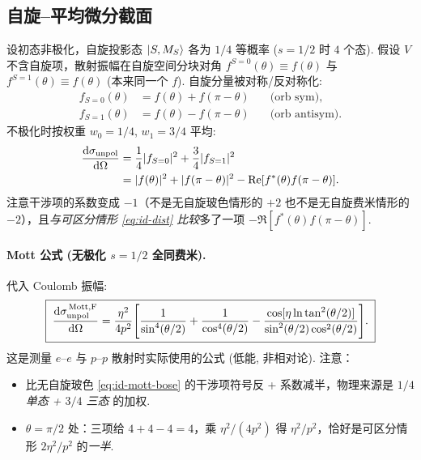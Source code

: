 \subsection{自旋--平均微分截面}\label{sec:id-unpol-dsigma}

设初态非极化，自旋投影态 $\ket{S,M_S}$ 各为 $1/4$ 等概率 ($s=1/2$ 时 $4$ 个态). 假设 $V$ 不含自旋项，散射振幅在自旋空间分块对角 $f^{S=0}(\theta)\equiv f(\theta)$ 与 $f^{S=1}(\theta)\equiv f(\theta)$ (本来同一个 $f$). 自旋分量被对称/反对称化:
\begin{align}
  f_{S=0}(\theta)&=f(\theta)+f(\pi-\theta)\quad &\text{(orb sym)},\\
  f_{S=1}(\theta)&=f(\theta)-f(\pi-\theta)\quad &\text{(orb antisym)}.
\end{align}
不极化时按权重 $w_0=1/4$, $w_1=3/4$ 平均:
\begin{align}
  \frac{\mathrm{d}\sigma_{\rm unpol}}{\mathrm{d}\Omega}
  &=\frac{1}{4}|f_{S=0}|^2+\frac{3}{4}|f_{S=1}|^2\nonumber\\
  &=|f(\theta)|^2+|f(\pi-\theta)|^2
   -\Re[f^*(\theta)f(\pi-\theta)].
  \label{eq:id-unpol-master}
\end{align}
注意干涉项的系数变成 $-1$（不是无自旋玻色情形的 $+2$ 也不是无自旋费米情形的 $-2$），且\emph{与可区分情形 \eqref{eq:id-dist} 比较}多了一项 $-\Re[f^*(\theta)f(\pi-\theta)]$.

\paragraph{Mott 公式 (无极化 $s=1/2$ 全同费米).}\quad 代入 Coulomb 振幅:
\begin{equation}
  \boxed{\;
    \frac{\mathrm{d}\sigma_{\rm unpol}^{\,\rm Mott,F}}{\mathrm{d}\Omega}
    =\frac{\eta^2}{4p^2}\Biggl[\frac{1}{\sin^4(\theta/2)}+\frac{1}{\cos^4(\theta/2)}
      -\frac{\cos[\eta\ln\tan^2(\theta/2)]}{\sin^2(\theta/2)\cos^2(\theta/2)}\Biggr].
  \;}
  \label{eq:id-mott-fermi}
\end{equation}
这是测量 $e$--$e$ 与 $p$--$p$ 散射时实际使用的公式 (低能, 非相对论). 注意：
\begin{itemize}
  \item 比无自旋玻色 \eqref{eq:id-mott-bose} 的干涉项符号反 + 系数减半，物理来源是 \emph{$1/4$ 单态 + $3/4$ 三态} 的加权.
  \item $\theta=\pi/2$ 处：三项给 $4+4-4=4$，乘 $\eta^2/(4p^2)$ 得 $\eta^2/p^2$，恰好是可区分情形 $2\eta^2/p^2$ 的\emph{一半}.
\end{itemize}


